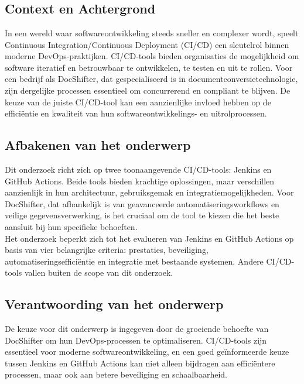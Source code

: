 
\chapter{}%
\label{ch:inleiding}
\section{Context en Achtergrond}
In een wereld waar softwareontwikkeling steeds sneller en complexer wordt, speelt Continuous Integration/Continuous Deployment (CI/CD) een sleutelrol binnen moderne DevOps-praktijken. CI/CD-tools bieden organisaties de mogelijkheid om software iteratief en betrouwbaar te ontwikkelen, te testen en uit te rollen. Voor een bedrijf als DocShifter, dat gespecialiseerd is in documentconversietechnologie, zijn dergelijke processen essentieel om concurrerend en compliant te blijven. De keuze van de juiste CI/CD-tool kan een aanzienlijke invloed hebben op de efficiëntie en kwaliteit van hun softwareontwikkelings- en uitrolprocessen.

\section{Afbakenen van het onderwerp}
Dit onderzoek richt zich op twee toonaangevende CI/CD-tools: Jenkins en GitHub Actions. Beide tools bieden krachtige oplossingen, maar verschillen aanzienlijk in hun architectuur, gebruiksgemak en integratiemogelijkheden. Voor DocShifter, dat afhankelijk is van geavanceerde automatiseringsworkflows en veilige gegevensverwerking, is het cruciaal om de tool te kiezen die het beste aansluit bij hun specifieke behoeften.
\\
Het onderzoek beperkt zich tot het evalueren van Jenkins en GitHub Actions op basis van vier belangrijke criteria: prestaties, beveiliging, automatiseringsefficiëntie en integratie met bestaande systemen. Andere CI/CD-tools vallen buiten de scope van dit onderzoek.

\section{Verantwoording van het onderwerp}
De keuze voor dit onderwerp is ingegeven door de groeiende behoefte van DocShifter om hun DevOps-processen te optimaliseren. CI/CD-tools zijn essentieel voor moderne softwareontwikkeling, en een goed geïnformeerde keuze tussen Jenkins en GitHub Actions kan niet alleen bijdragen aan efficiëntere processen, maar ook aan betere beveiliging en schaalbaarheid. 

